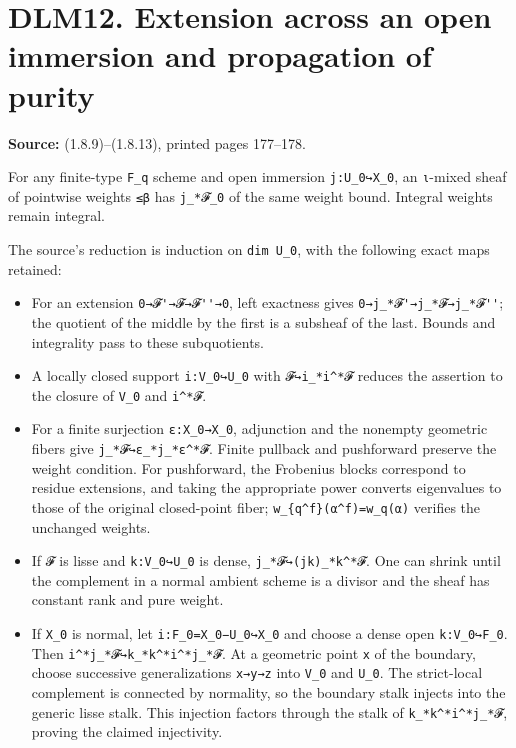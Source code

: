 \documentclass[
]{report}
\newcounter{none} %
\providecommand{\tightlist}{%
  \setlength{\itemsep}{0pt}\setlength{\parskip}{0pt}}
\begin{document}
\section{DLM12. Extension across an open immersion and propagation of
purity}\label{dlm12.-extension-across-an-open-immersion-and-propagation-of-purity}

\textbf{Source:} (1.8.9)--(1.8.13), printed pages 177--178.

For any finite-type \texttt{F\_q} scheme and open immersion
\texttt{j:U\_0↪X\_0}, an \texttt{ι}-mixed sheaf of pointwise weights
\texttt{≤β} has \texttt{j\_*𝓕\_0} of the same weight bound. Integral
weights remain integral.

The source's reduction is induction on \texttt{dim\ U\_0}, with the
following exact maps retained:

\begin{itemize}
\tightlist
\item
  For an extension \nolinkurl{0→𝓕'→𝓕→𝓕''→0}, left exactness gives
  \nolinkurl{0→j_*𝓕'→j_*𝓕→j_*𝓕''}; the quotient of the middle by the
  first is a subsheaf of the last. Bounds and integrality pass to these
  subquotients.
\item
  A locally closed support \texttt{i:V\_0↪U\_0} with
  \texttt{𝓕↪i\_*i\^{}*𝓕} reduces the assertion to the closure of
  \texttt{V\_0} and \texttt{i\^{}*𝓕}.
\item
  For a finite surjection \texttt{ε:X\textquotesingle{}\_0→X\_0},
  adjunction and the nonempty geometric fibers give
  \texttt{j\_*𝓕↪ε\_*j\textquotesingle{}\_*ε\^{}*𝓕}. Finite pullback and
  pushforward preserve the weight condition. For pushforward, the
  Frobenius blocks correspond to residue extensions, and taking the
  appropriate power converts eigenvalues to those of the original
  closed-point fiber; \texttt{w\_\{q\^{}f\}(α\^{}f)=w\_q(α)} verifies
  the unchanged weights.
\item
  If \texttt{𝓕} is lisse and \texttt{k:V\_0↪U\_0} is dense,
  \texttt{j\_*𝓕↪(jk)\_*k\^{}*𝓕}. One can shrink until the complement in
  a normal ambient scheme is a divisor and the sheaf has constant rank
  and pure weight.
\item
  If \texttt{X\_0} is normal, let \texttt{i:F\_0=X\_0−U\_0↪X\_0} and
  choose a dense open \texttt{k:V\_0↪F\_0}. Then
  \nolinkurl{i^*j_*𝓕↪k_*k^*i^*j_*𝓕}. At a geometric point \texttt{x} of
  the boundary, choose successive generalizations \texttt{x→y→z} into
  \texttt{V\_0} and \texttt{U\_0}. The strict-local complement is
  connected by normality, so the boundary stalk injects into the generic
  lisse stalk. This injection factors through the stalk of
  \texttt{k\_*k\^{}*i\^{}*j\_*𝓕}, proving the claimed injectivity.
\end{itemize}
\end{document}
